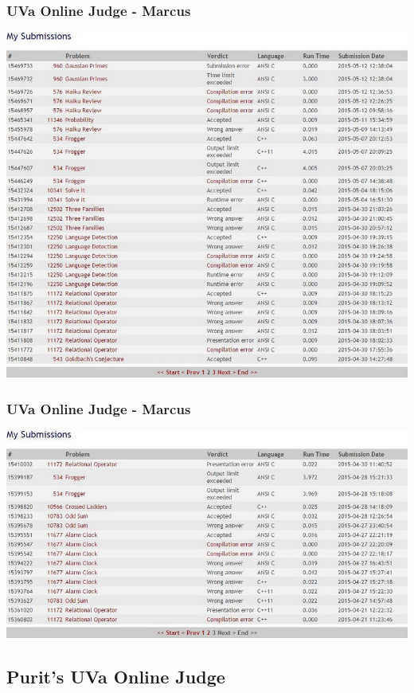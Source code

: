 \documentclass{beamer}
\begin{document}
			\begin{frame}
				\frametitle{UVa Online Judge - Marcus}
				\begin{center}
					\includegraphics[scale=0.30]{Submission2-2} 
				\end{center}
			\end{frame}

			\begin{frame}
				\frametitle{UVa Online Judge - Marcus}
				\begin{center}
					\includegraphics[scale=0.35]{Submission2-3} 
				\end{center}
			\end{frame}

		\subsection{Purit's UVa Online Judge}
			\begin{frame}
				\subsectionpage
			\end{frame}
\end{document}
